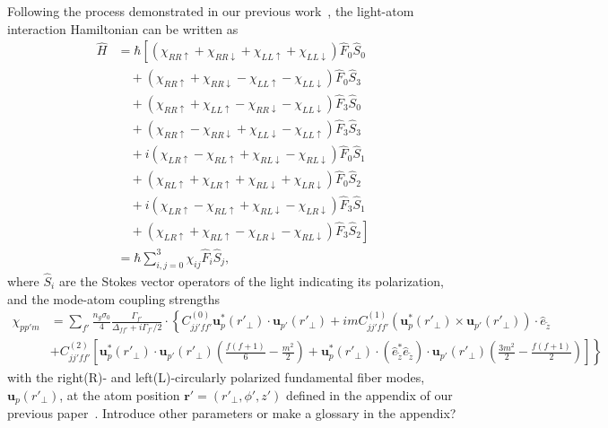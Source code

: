 \documentclass[preprint,aps,pra,onecolumn,superscriptaddress]{revtex4-1} %
\def\br{\mathbf{r}}
\def\bra#1{\langle{#1}\rvert}%
\def\ket#1{\lvert{#1}\rangle}%
\newcommand{\comment}[1]{{\color{Maroon} #1}}
\begin{document}
Following the process demonstrated in our previous work~\cite{Qi2016}, the light-atom interaction Hamiltonian can be written as
\begin{align}
\hat{H} &= \hbar \left[\left(\chi_{RR\uparrow} + \chi_{RR\downarrow} +\chi_{LL\uparrow}+\chi_{LL\downarrow} \right)\hat{F}_0\hat{S}_0 \right.\nonumber\\
&\quad+\left(\chi_{RR\uparrow} + \chi_{RR\downarrow} -\chi_{LL\uparrow}-\chi_{LL\downarrow} \right)\hat{F}_0\hat{S}_3\nonumber\\
&\quad+\left(\chi_{RR\uparrow} + \chi_{LL\uparrow} -\chi_{RR\downarrow}-\chi_{LL\downarrow} \right)\hat{F}_3\hat{S}_0\nonumber\\
&\quad+\left(\chi_{RR\uparrow} - \chi_{RR\downarrow} +\chi_{LL\downarrow}-\chi_{LL\uparrow} \right)\hat{F}_3\hat{S}_3\nonumber\\
&\quad+i\left(\chi_{LR\uparrow} - \chi_{RL\uparrow} +\chi_{RL\downarrow}-\chi_{RL\downarrow} \right)\hat{F}_0\hat{S}_1\nonumber\\
&\quad+\left(\chi_{RL\uparrow} + \chi_{LR\uparrow} +\chi_{RL\downarrow}+\chi_{LR\downarrow} \right)\hat{F}_0\hat{S}_2\nonumber\\
&\quad+i\left(\chi_{LR\uparrow} - \chi_{RL\uparrow} +\chi_{RL\downarrow}-\chi_{LR\downarrow} \right)\hat{F}_3\hat{S}_1\nonumber\\
&\quad+\left.\left(\chi_{LR\uparrow} + \chi_{RL\uparrow} -\chi_{LR\downarrow}-\chi_{RL\downarrow} \right)\hat{F}_3\hat{S}_2 \right]\\
&=\hbar\sum_{i,j=0}^3 \chi_{ij}\hat{F}_i\hat{S}_j,
\end{align}
where $ \hat{S}_i $ are the Stokes vector operators of the light indicating its polarization, and the mode-atom coupling strengths
\begin{align}
\chi_{pp'm} 
&= \sum_{f'} \frac{n_g\sigma_0}{4}\frac{\Gamma_{f'}}{\Delta_{ff'}+i\Gamma_{f'}/2}\cdot \left\{ C_{jj'ff'}^{(0)}\mathbf{u}_p^*(r'\!_\perp)\cdot \mathbf{u}_{p'}(r'\!_\perp)+imC_{jj'ff'}^{(1)}\left(\mathbf{u}_p^*(r'\!_\perp)\times\mathbf{u}_{p'}(r'\!_\perp) \right)\cdot \hat{e}_{\tilde{z}} \right. \nonumber\\
&\left.+C_{jj'ff'}^{(2)}\left[\mathbf{u}_p^*(r'\!_\perp)\cdot \mathbf{u}_{p'}(r'\!_\perp)\left(\frac{f(f+1)}{6}-\frac{m^2}{2} \right)+\mathbf{u}_p^*(r'\!_\perp)\cdot (\hat{e}^*_{\tilde{z}}\hat{e}_{\tilde{z}})\cdot \mathbf{u}_{p'}(r'\!_\perp)\left(\frac{3m^2}{2}-\frac{f(f+1)}{2} \right) \right] \right\}
\end{align}
with the right(R)- and left(L)-circularly polarized fundamental fiber modes, $ \mathbf{u}_p(r'\!_\perp) $, at the atom position $ \br'=(r'\!_\perp,\phi',z') $ defined in the appendix of our previous paper~\cite{Qi2016}. 
\comment{Introduce other parameters or make a glossary in the appendix?}
\end{document}
